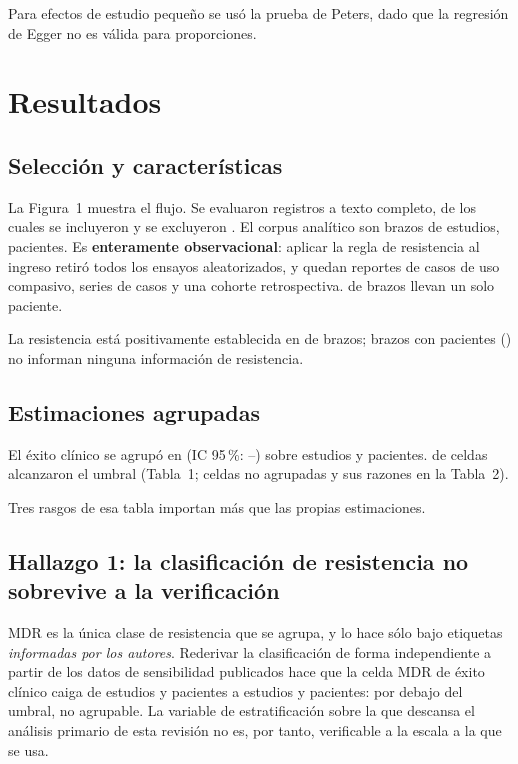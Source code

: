 \documentclass[12pt]{article}
\begin{document}
Para efectos de estudio pequeño se usó la prueba de Peters, dado que la
regresión de Egger no es válida para proporciones.

\section{Resultados}

\subsection*{Selección y características}

La Figura~1 muestra el flujo. Se evaluaron \PrismaAssessed registros a texto
completo, de los cuales se incluyeron \PrismaIncludedStudies y se excluyeron
\PrismaExcluded. El corpus analítico son \ArmsAnalysed brazos de
\StudiesAnalysed estudios, \PatientsAnalysed pacientes. Es \textbf{enteramente
observacional}: aplicar la regla de resistencia al ingreso retiró todos los
ensayos aleatorizados, y quedan reportes de casos de uso compasivo, series de
casos y una cohorte retrospectiva. \SingleArmArms de \ArmsAnalysed brazos llevan
un solo paciente.

La resistencia está positivamente establecida en \ResClassifiedArms de
\ArmsAnalysed brazos; \ResNotClassifiableArms brazos con
\ResNotClassifiablePatients pacientes (\ResNotClassifiablePct) no informan
ninguna información de resistencia.

\subsection*{Estimaciones agrupadas}

El éxito clínico se agrupó en \CsOverallEst (IC 95\,\%:
\CsOverallLo--\CsOverallHi) sobre \CsOverallK estudios y \CsOverallN pacientes.
\CellsPooled de \CellsTotal celdas alcanzaron el umbral (Tabla~1; celdas no
agrupadas y sus razones en la Tabla~2).

Tres rasgos de esa tabla importan más que las propias estimaciones.

\subsection*{Hallazgo 1: la clasificación de resistencia no sobrevive a la verificación}

MDR es la única clase de resistencia que se agrupa, y lo hace sólo bajo etiquetas
\emph{informadas por los autores}. Rederivar la clasificación de forma
independiente a partir de los datos de sensibilidad publicados hace que la celda
MDR de éxito clínico caiga de \ClassMDRStudiesAll estudios y
\ClassMDRPatientsAll pacientes a \ClassMDRStudiesVerified estudios y
\ClassMDRPatientsVerified pacientes: por debajo del umbral, no agrupable. La
variable de estratificación sobre la que descansa el análisis primario de esta
revisión no es, por tanto, verificable a la escala a la que se usa.
\end{document}
